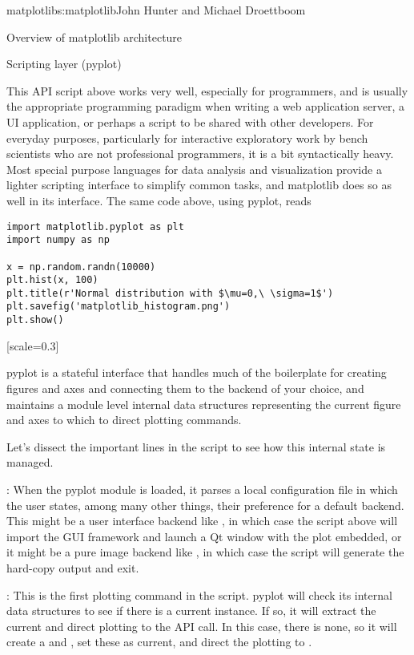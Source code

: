 \begin{aosachapter}{matplotlib}{s:matplotlib}{John Hunter and Michael Droettboom}
\begin{aosasect1}{Overview of matplotlib architecture}
\begin{aosasect2}{Scripting layer (pyplot)}

  This API script above works very well, especially for programmers,
  and is usually the appropriate programming paradigm when writing a
  web application server, a UI application, or perhaps a script to be
  shared with other developers.  For everyday purposes, particularly
  for interactive exploratory work by bench scientists who are not
  professional programmers, it is a bit syntactically heavy.  Most
  special purpose languages for data analysis and visualization
  provide a lighter scripting interface to simplify common tasks, and
  matplotlib does so as well in its 
  interface.  The same code above, using pyplot, reads

\begin{verbatim}
import matplotlib.pyplot as plt
import numpy as np

x = np.random.randn(10000)
plt.hist(x, 100)
plt.title(r'Normal distribution with $\mu=0,\ \sigma=1$')
plt.savefig('matplotlib_histogram.png')
plt.show()
\end{verbatim}

[scale=0.3]


pyplot is a stateful interface that handles much of the boilerplate
for creating figures and axes and connecting them to the backend of
your choice, and maintains a module level internal data structures
representing the current figure and axes to which to direct plotting
commands.

Let's dissect the important lines in the script to see how this
internal state is managed.

\begin{aosaitemize}

\item {}: When the pyplot module
  is loaded, it parses a local configuration file in which the user
  states, among many other things, their preference for a default
  backend.  This might be a user interface backend like ,
  in which case the script above will import the GUI framework and
  launch a Qt window with the plot embedded, or it might be a pure
  image backend like , in which case the script will
  generate the hard-copy output and exit.

\item {}: This is the first plotting command in
  the script.  pyplot will check its internal data structures to see
  if there is a current  instance.  If so, it will
  extract the current  and direct plotting to the
   API call.  In this case, there is none, so it will
  create a  and , set these as current, and
  direct the plotting to .


\end{aosaitemize}
\end{aosasect2}
\end{aosasect1}
\end{aosachapter}
